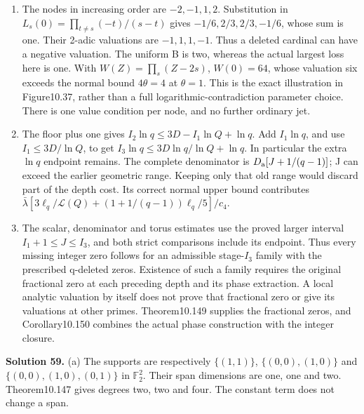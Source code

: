\documentclass[
  11pt,
  a4paper,
]{article}
\begin{document}
\begin{enumerate}
\def\labelenumi{(\alph{enumi})}
\setcounter{enumi}{1}
\item
  The nodes in increasing order are \(-2,-1,1,2\). Substitution in
  \(L_s(0)=\prod_{t\ne s}(-t)/(s-t)\) gives \(-1/6,2/3,2/3,-1/6\), whose
  sum is one. Their 2-adic valuations are \(-1,1,1,-1\). Thus a deleted
  cardinal can have a negative valuation. The uniform B is two, whereas
  the actual largest loss here is one. With \(W(Z)=\prod_s(Z-2s)\),
  \(W(0)=64\), whose valuation six exceeds the normal bound
  \(4\theta=4\) at \(\theta=1\). This is the exact illustration in
  Figure10.37, rather than a full logarithmic-contradiction parameter
  choice. There is one value condition per node, and no further ordinary
  jet.
\item
  The floor plus one gives \(I_2\ln q\le3D-I_1\ln Q+\ln q\). Add
  \(I_1\ln q\), and use \(I_1\le3D/\ln Q\), to get
  \(I_3\ln q\le3D\ln q/\ln Q+\ln q\). In particular the extra \(\ln q\)
  endpoint remains. The complete denominator is
  \(D_{\rm a}[J+1/(q-1)]\); J can exceed the earlier geometric range.
  Keeping only that old range would discard part of the depth cost. Its
  correct normal upper bound contributes
  \(\bar\lambda[3\ell_q/\mathcal L(Q)+(1+1/(q-1))\ell_q/5]/c_4\).
\item
  The scalar, denominator and torus estimates use the proved larger
  interval \(I_1+1\le J\le I_3\), and both strict comparisons include
  its endpoint. Thus every missing integer zero follows for an
  admissible stage-\(I_3\) family with the prescribed q-deleted zeros.
  Existence of such a family requires the original fractional zero at
  each preceding depth and its phase extraction. A local analytic
  valuation by itself does not prove that fractional zero or give its
  valuations at other primes. Theorem10.149 supplies the fractional
  zeros, and Corollary10.150 combines the actual phase construction with
  the integer closure.
\end{enumerate}

\textbf{Solution 59.} (a) The supports are respectively \(\{(1,1)\}\),
\(\{(0,0),(1,0)\}\) and \(\{(0,0),(1,0),(0,1)\}\) in \(\mathbb F_2^2\).
Their span dimensions are one, one and two. Theorem10.147 gives degrees
two, two and four. The constant term does not change a span.
\end{document}
